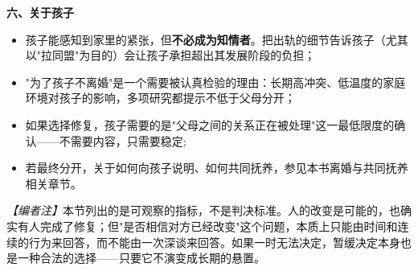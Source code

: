 \textbf{六、关于孩子}

\begin{itemize}
\item 孩子能感知到家里的紧张，但\textbf{不必成为知情者}。把出轨的细节告诉孩子（尤其以"拉同盟"为目的）会让孩子承担超出其发展阶段的负担；
\item "为了孩子不离婚"是一个需要被认真检验的理由：长期高冲突、低温度的家庭环境对孩子的影响，多项研究都提示不低于父母分开；
\item 如果选择修复，孩子需要的是"父母之间的关系正在被处理"这一最低限度的确认——不需要内容，只需要稳定;
\item 若最终分开，关于如何向孩子说明、如何共同抚养，参见本书离婚与共同抚养相关章节。
\end{itemize}

\textit{【编者注】}本节列出的是可观察的指标，不是判决标准。人的改变是可能的，也确实有人完成了修复；但"是否相信对方已经改变"这个问题，本质上只能由时间和连续的行为来回答，而不能由一次深谈来回答。如果一时无法决定，暂缓决定本身也是一种合法的选择——只要它不演变成长期的悬置。

